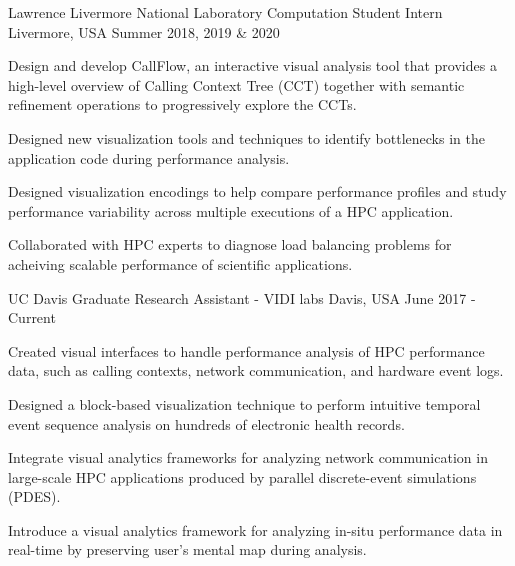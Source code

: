 

\begin{cventries}

  \cventry
    {Lawrence Livermore National Laboratory} %
    {Computation Student Intern} %
    {Livermore, USA} %
    {Summer 2018, 2019 \& 2020} %
    {
      \begin{cvitems} %
        \item {Design and develop CallFlow, an interactive visual analysis tool that provides a high-level overview of Calling Context Tree (CCT) together with semantic refinement operations to progressively explore the CCTs.} 
        \item {Designed new visualization tools and techniques to identify bottlenecks in the application code during performance analysis.}
        \item {Designed visualization encodings to help compare performance profiles and study performance variability across multiple executions of a HPC application.}
        \item{Collaborated with HPC experts to diagnose load balancing problems for acheiving scalable performance of scientific applications.}
      \end{cvitems}
    }
    
  \cventry
    {UC Davis} %
    {Graduate Research Assistant - VIDI labs} %
    {Davis, USA} %
    {June 2017 - Current} %
    {
      \begin{cvitems} %
        \item{Created visual interfaces to handle performance analysis of HPC performance data, such as calling contexts, network communication, and hardware event logs.}
        \item{Designed a block-based visualization technique to perform intuitive temporal event sequence analysis on hundreds of electronic health records.}
        \item {Integrate visual analytics frameworks for analyzing network communication in large-scale HPC applications produced by parallel discrete-event simulations (PDES).}
        \item {Introduce a visual analytics framework for analyzing in-situ performance data in real-time by preserving user's mental map during analysis.}
      \end{cvitems}
    }
    

\end{cventries}
